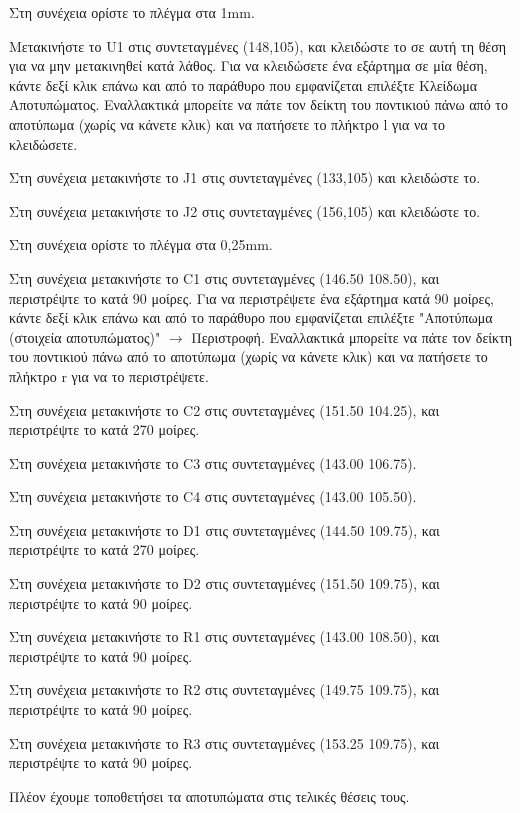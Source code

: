 \documentclass[a4paper]{article}
\begin{document}

Στη συνέχεια ορίστε το πλέγμα στα 1mm.

Μετακινήστε το U1 στις συντεταγμένες (148,105), και κλειδώστε το σε αυτή τη θέση για να μην μετακινηθεί κατά λάθος. Για να κλειδώσετε ένα εξάρτημα σε μία θέση, κάντε δεξί κλικ επάνω και από το παράθυρο που εμφανίζεται επιλέξτε Κλείδωμα Αποτυπώματος. Εναλλακτικά μπορείτε να πάτε τον δείκτη του ποντικιού πάνω από το αποτύπωμα (χωρίς να κάνετε κλικ) και να πατήσετε το πλήκτρο l για να το κλειδώσετε.

Στη συνέχεια μετακινήστε το J1 στις συντεταγμένες (133,105) και κλειδώστε το.

Στη συνέχεια μετακινήστε το J2 στις συντεταγμένες (156,105) και κλειδώστε το.

Στη συνέχεια ορίστε το πλέγμα στα 0,25mm.

Στη συνέχεια μετακινήστε το C1 στις συντεταγμένες (146.50 108.50), και περιστρέψτε το κατά 90 μοίρες.  Για να περιστρέψετε ένα εξάρτημα κατά 90 μοίρες, κάντε δεξί κλικ επάνω και από το παράθυρο που εμφανίζεται επιλέξτε "Αποτύπωμα (στοιχεία αποτυπώματος)" $\rightarrow$ Περιστροφή. Εναλλακτικά μπορείτε να πάτε τον δείκτη του ποντικιού πάνω από το αποτύπωμα (χωρίς να κάνετε κλικ) και να πατήσετε το πλήκτρο r για να το περιστρέψετε.


Στη συνέχεια μετακινήστε το C2 στις συντεταγμένες (151.50 104.25), και περιστρέψτε το κατά 270 μοίρες. 

Στη συνέχεια μετακινήστε το C3 στις συντεταγμένες (143.00 106.75).

Στη συνέχεια μετακινήστε το C4 στις συντεταγμένες (143.00 105.50).

Στη συνέχεια μετακινήστε το D1 στις συντεταγμένες (144.50 109.75), και περιστρέψτε το κατά 270 μοίρες. 

Στη συνέχεια μετακινήστε το D2 στις συντεταγμένες (151.50 109.75), και περιστρέψτε το κατά  90 μοίρες. 

Στη συνέχεια μετακινήστε το R1 στις συντεταγμένες (143.00 108.50), και περιστρέψτε το κατά  90 μοίρες. 

Στη συνέχεια μετακινήστε το R2 στις συντεταγμένες (149.75 109.75), και περιστρέψτε το κατά  90 μοίρες. 

Στη συνέχεια μετακινήστε το R3 στις συντεταγμένες (153.25 109.75), και περιστρέψτε το κατά  90 μοίρες. 

Πλέον έχουμε τοποθετήσει τα αποτυπώματα στις τελικές θέσεις τους.
 
\end{document}

